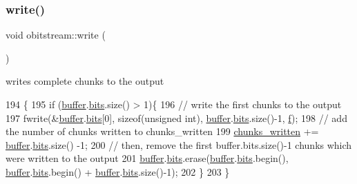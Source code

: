 \subsubsection{\texorpdfstring{write()}{write()}}
{\footnotesize\ttfamily void obitstream\+::write (\begin{DoxyParamCaption}{ }\end{DoxyParamCaption})\hspace{0.3cm}{\ttfamily [private]}}



writes complete chunks to the output 


\begin{DoxyCode}
194                       \{
195   \textcolor{keywordflow}{if} (\hyperlink{classobitstream_aeaccad00a395a404aa16472bfa052be3}{buffer}.\hyperlink{classbit__pipe_a86f38af1e9736b053728033490476b50}{bits}.size() > 1)\{
196     \textcolor{comment}{// write the first chunks to the output}
197     fwrite(&\hyperlink{classobitstream_aeaccad00a395a404aa16472bfa052be3}{buffer}.\hyperlink{classbit__pipe_a86f38af1e9736b053728033490476b50}{bits}[0], \textcolor{keyword}{sizeof}(\textcolor{keywordtype}{unsigned} \textcolor{keywordtype}{int}), \hyperlink{classobitstream_aeaccad00a395a404aa16472bfa052be3}{buffer}.\hyperlink{classbit__pipe_a86f38af1e9736b053728033490476b50}{bits}.size()-1, 
      \hyperlink{classobitstream_ac589d74745217748c888ae777ab324a7}{f});
198     \textcolor{comment}{// add the number of chunks written to chunks\_written}
199     \hyperlink{classobitstream_a3022397f2b6133ea5990016d9d078a2f}{chunks\_written} += \hyperlink{classobitstream_aeaccad00a395a404aa16472bfa052be3}{buffer}.\hyperlink{classbit__pipe_a86f38af1e9736b053728033490476b50}{bits}.size() -1;
200     \textcolor{comment}{// then, remove the first buffer.bits.size()-1 chunks which were written to the output}
201     \hyperlink{classobitstream_aeaccad00a395a404aa16472bfa052be3}{buffer}.\hyperlink{classbit__pipe_a86f38af1e9736b053728033490476b50}{bits}.erase(\hyperlink{classobitstream_aeaccad00a395a404aa16472bfa052be3}{buffer}.\hyperlink{classbit__pipe_a86f38af1e9736b053728033490476b50}{bits}.begin(), \hyperlink{classobitstream_aeaccad00a395a404aa16472bfa052be3}{buffer}.\hyperlink{classbit__pipe_a86f38af1e9736b053728033490476b50}{bits}.begin() + 
      \hyperlink{classobitstream_aeaccad00a395a404aa16472bfa052be3}{buffer}.\hyperlink{classbit__pipe_a86f38af1e9736b053728033490476b50}{bits}.size()-1); 
202   \}
203 \}
\end{DoxyCode}
\mbox{\label{classobitstream_afb0cc2fb4f739881436d887bd4770355}} 
